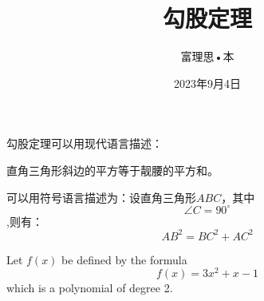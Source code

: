 \documentclass[12pt ,a4paper, oneside]{ctexart}
\title{\heiti 勾股定理}	%
\author{\kaishu 富理思•本}
\date{2023年9月4日}
\newcommand\degree{^\circ}	%
\begin{document}
\maketitle

勾股定理可以用现代语言描述：

直角三角形斜边的平方等于靓腰的平方和。

可以用符号语言描述为：设直角三角形$ABC$，其中$$\angle C=90\degree$$,则有：
\begin{equation}	%
AB^2 = BC^2 + AC^2
\end{equation}


Let $f(x)$ be defined by the formula $$f(x) = 3x^2 + x - 1$$ which is a polynomial of degree 2.
\end{document}
